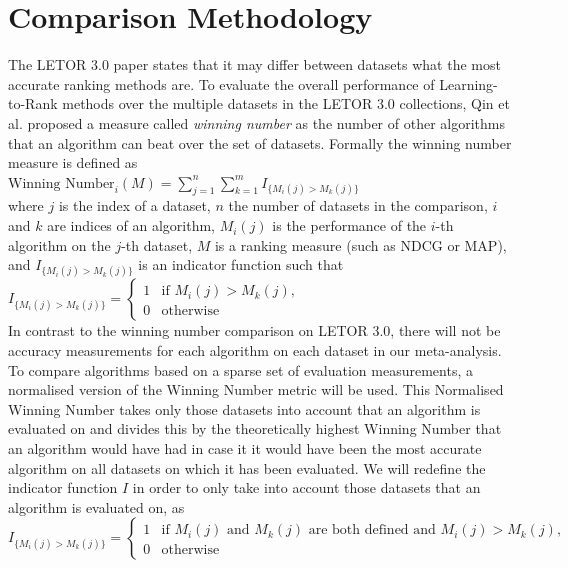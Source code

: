 \documentclass{sig-alternate-2013}
\begin{document}
\section{Comparison Methodology}
The LETOR 3.0 paper \cite{Qin2010} states that it may differ between datasets what the most accurate ranking methods are. To evaluate the overall performance of Learning-to-Rank methods over the multiple datasets in the LETOR 3.0 collections, Qin et al. \cite{Qin2010} proposed a measure called \emph{winning number} as the number of other algorithms that an algorithm can beat over the set of datasets. Formally the winning number measure is defined as\\

$\text{Winning Number}_i(M) = \sum\nolimits_{j=1}^n \sum\nolimits_{k=1}^m I_{\{M_i(j)>M_k(j)\}}$\\

where $j$ is the index of a dataset, $n$ the number of datasets in the comparison, $i$ and $k$ are indices of an algorithm, $M_i(j)$ is the performance of the $i$-th algorithm on the $j$-th dataset, $M$ is a ranking measure (such as NDCG or MAP), and $I_{\{M_i(j)>M_k(j)\}}$ is an indicator function such that\\

$I_{\{M_i(j)>M_k(j)\}} = \begin{cases}
1 & \text{if } M_i(j) > M_k(j), \\
0 & \text{otherwise}
\end{cases}$\\

In contrast to the winning number comparison on LETOR 3.0, there will not be accuracy measurements for each algorithm on each dataset in our meta-analysis. To compare algorithms based on a sparse set of evaluation measurements, a normalised version of the Winning Number metric will be used. This Normalised Winning Number takes only those datasets into account that an algorithm is evaluated on and divides this by the theoretically highest Winning Number that an algorithm would have had in case it it would have been the most accurate algorithm on all datasets on which it has been evaluated. We will redefine the indicator function $I$ in order to only take into account those datasets that an algorithm is evaluated on, as \\

$I_{\{M_i(j)>M_k(j)\}} = \begin{cases}
1 & \text{if } M_i(j) \text{ and } M_k(j) \text{ are both defined and } M_i(j) > M_k(j), \\
0 & \text{otherwise}
\end{cases}$\\
\end{document}
